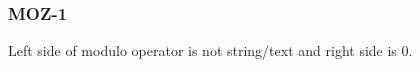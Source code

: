 \subsubsection{MOZ-1}\label{sec:error_code_moz_1}

Left side of modulo operator is not string/text and right side is 0.


